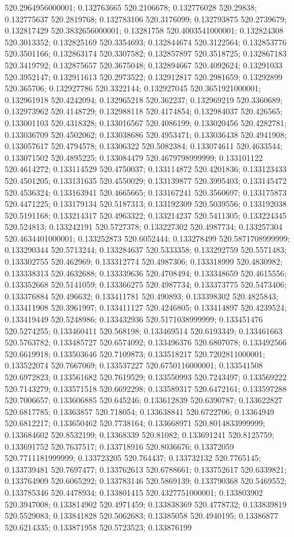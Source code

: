 520.2964956000001; 0.132763665 520.2106678; 0.132776028 520.29838; 0.132775637 520.2819768; 0.132783106 520.3176099; 0.132793875 520.2739679; 0.132817429 520.3832656000001; 0.13281758 520.4003541000001; 0.132824308 520.3013352; 0.132825169 520.3354693; 0.132844674 520.3122564; 0.132853776 520.3501166; 0.132863174 520.3307582; 0.132857897 520.3518725; 0.132867183 520.3419792; 0.132875657 520.3675048; 0.132894667 520.4092624; 0.13291033 520.3952147; 0.132911613 520.2973522; 0.132912817 520.2981659; 0.13292899 520.365706; 0.132927786 520.3322144; 0.132927045 520.3651921000001; 0.132961918 520.4242094; 0.132965218 520.362237; 0.132969219 520.3360689; 0.132973962 520.4148729; 0.132988118 520.4174854; 0.132984037 520.426565; 0.133001103 520.4318328; 0.133016567 520.4086199; 0.133020456 520.4282781; 0.133036709 520.4502062; 0.133038686 520.4953471; 0.133036438 520.4941908; 0.133057617 520.4794578; 0.13306322 520.5082384; 0.133074611 520.4633544; 0.133071502 520.4895225; 0.133084479 520.4679798999999; 0.133101122 520.4614272; 0.133114529 520.4750037; 0.133114872 520.4201836; 0.133123433 520.4501205; 0.133131635 520.4550029; 0.133139877 520.3995403; 0.133145472 520.4536324; 0.133163941 520.4665665; 0.133167241 520.3560697; 0.133175873 520.4471225; 0.133179134 520.5187313; 0.133192309 520.5039556; 0.133192038 520.5191168; 0.133214317 520.4963322; 0.133214237 520.5411305; 0.133224345 520.524813; 0.133242191 520.5727378; 0.133227302 520.4987734; 0.133257304 520.4634401000001; 0.133252873 520.6052444; 0.133278499 520.5871708999999; 0.133290344 520.5713244; 0.133284637 520.5333358; 0.133292759 520.5571483; 0.133302755 520.462969; 0.133312774 520.4987306; 0.133318999 520.4830982; 0.133338313 520.4632688; 0.133339636 520.4708494; 0.133348659 520.4615556; 0.133352668 520.5141059; 0.133366275 520.4987734; 0.133373775 520.5473406; 0.133376884 520.496632; 0.133411781 520.490893; 0.133398302 520.4825843; 0.133411908 520.3961997; 0.133411127 520.4246805; 0.133414897 520.4239524; 0.133419449 520.5248986; 0.133432936 520.5171038999999; 0.133451476 520.5274255; 0.133460411 520.568198; 0.133469514 520.6193349; 0.133461663 520.5763782; 0.133485727 520.6574092; 0.133496376 520.6807078; 0.133492566 520.6619918; 0.133503646 520.7109873; 0.133518217 520.7202811000001; 0.133522074 520.7667069; 0.133537227 520.6750116000001; 0.133541508 520.6972823; 0.133561682 520.7619529; 0.133550993 520.7243497; 0.133569222 520.7143279; 0.133571518 520.6692298; 0.133589317 520.6472161; 0.133597288 520.7006657; 0.133606885 520.645246; 0.133612839 520.6390787; 0.133622827 520.6817785; 0.13363857 520.718054; 0.133638841 520.6722706; 0.13364949 520.6812217; 0.133650462 520.7738164; 0.133668971 520.8014833999999; 0.133684602 520.8532199; 0.13368339 520.81082; 0.133691241 520.8125759; 0.133691752 520.7637517; 0.133718916 520.8036676; 0.13372059 520.7711181999999; 0.133723205 520.764437; 0.133732132 520.7765145; 0.133739481 520.7697477; 0.133762613 520.6788661; 0.133752617 520.6339821; 0.133764909 520.6065292; 0.133783146 520.5869139; 0.133790368 520.5469552; 0.133785346 520.4478934; 0.133801415 520.4327751000001; 0.133803902 520.3947008; 0.133814902 520.4971459; 0.133838369 520.4778732; 0.133839819 520.5529083; 0.133841828 520.5062683; 0.13385058 520.4940195; 0.13386877 520.6214335; 0.133871958 520.5723523; 0.133876199 